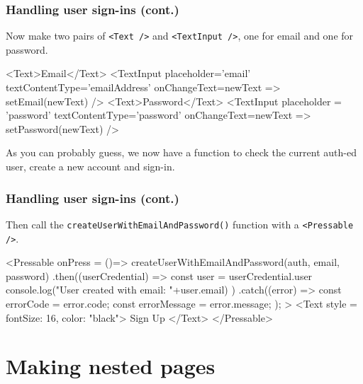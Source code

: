 \documentclass{beamer}
\begin{document}
  \begin{frame}[fragile]
    \frametitle{Handling user sign-ins (cont.)}
    Now make two pairs of \verb|<Text />| and \verb|<TextInput />|, one for email and one for password. 

    \begin{jscodesmall}
<Text>Email</Text>
<TextInput
        placeholder='email'
        textContentType='emailAddress'
        onChangeText={newText => setEmail(newText)}
    />
<Text>Password</Text>
<TextInput
    placeholder = 'password'
    textContentType='password'
    onChangeText={newText => setPassword(newText)}
/>
    \end{jscodesmall}

    As you can probably guess, we now have a function to check the current auth-ed user, create a new account and sign-in.
  \end{frame}
  \begin{frame}[fragile]
    \frametitle{Handling user sign-ins (cont.)}
    Then call the \verb|createUserWithEmailAndPassword()| function with a \verb|<Pressable />|. 

    \begin{jscodesmall}
<Pressable 
onPress = {()=>{
  createUserWithEmailAndPassword(auth, email, password)
    .then((userCredential) => { 
        const user = userCredential.user
        console.log("User created with email: "+user.email)
    })
    .catch((error) => {
        const errorCode = error.code;
        const errorMessage = error.message;
    });
}}
>
    <Text style = {{fontSize: 16, color: "black"}}> Sign Up </Text>
</Pressable>
    \end{jscodesmall}
  \end{frame}

    \section{Making nested pages}
\end{document}

